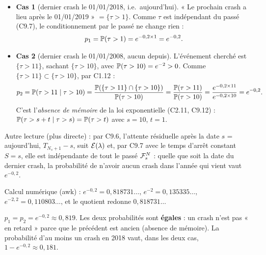 \documentclass[11pt,a4paper]{article}
\begin{document}
\begin{exo}
\begin{itemize}
  \item \textbf{Cas 1} (dernier crash le 01/01/2018, i.e.\ aujourd'hui). « Le prochain crash a lieu après le 01/01/2019 » $=\{\tau>1\}$.
  Comme $\tau$ est indépendant du passé (C9.7), le conditionnement par le passé ne change rien :
  \[p_1=\mathbb{P}(\tau>1)=e^{-0{,}2\times1}=e^{-0{,}2}.\]
  \item \textbf{Cas 2} (dernier crash le 01/01/2008, aucun depuis). L'événement cherché est $\{\tau>11\}$, sachant $\{\tau>10\}$, avec
  $\mathbb{P}(\tau>10)=e^{-2}>0$. Comme $\{\tau>11\}\subset\{\tau>10\}$, par C1.12 :
  \[p_2=\mathbb{P}(\tau>11\mid\tau>10)=\frac{\mathbb{P}(\{\tau>11\}\cap\{\tau>10\})}{\mathbb{P}(\tau>10)}=\frac{\mathbb{P}(\tau>11)}{\mathbb{P}(\tau>10)}
  =\frac{e^{-0{,}2\times11}}{e^{-0{,}2\times10}}=e^{-0{,}2}.\]
  C'est l'\emph{absence de mémoire} de la loi exponentielle (C2.11, C9.12) : $\mathbb{P}(\tau>s+t\mid\tau>s)=\mathbb{P}(\tau>t)$ avec $s=10$, $t=1$.
\end{itemize}
Autre lecture (plus directe) : par C9.6, l'attente résiduelle après la date $s$ = aujourd'hui, $T_{N_s+1}-s$, suit $\mathcal{E}(\lambda)$ et,
par C9.7 avec le temps d'arrêt constant $S=s$, elle est indépendante de tout le passé $\mathcal{F}^N_s$ : quelle que soit la date du dernier
crash, la probabilité de n'avoir aucun crash dans l'année qui vient vaut $e^{-0{,}2}$.

Calcul numérique (awk) : $e^{-0{,}2}=0{,}818731\ldots$, $e^{-2}=0{,}135335\ldots$, $e^{-2{,}2}=0{,}110803\ldots$, et le quotient redonne
$0{,}818731\ldots$

\begin{resultat}
$p_1=p_2=e^{-0{,}2}\approx 0{,}819$. Les deux probabilités sont \textbf{égales} : un crash n'est pas « en retard » parce que le précédent
est ancien (absence de mémoire). La probabilité d'au moins un crash en 2018 vaut, dans les deux cas, $1-e^{-0{,}2}\approx0{,}181$.
\end{resultat}
\end{exo}
\end{document}
